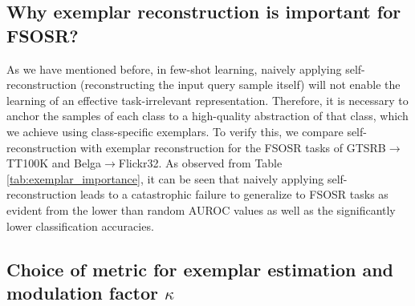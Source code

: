 \documentclass[10pt,journal,compsoc]{IEEEtran}
\begin{document}
\subsection{Why exemplar reconstruction is important for FSOSR?}
As we have mentioned before, in few-shot learning, naively applying self-reconstruction (reconstructing the input query sample itself) will not enable the learning of an effective task-irrelevant representation. Therefore, it is necessary to anchor the samples of each class to a high-quality abstraction of that class, which we achieve using class-specific exemplars. To verify this, we compare self-reconstruction with exemplar reconstruction for the FSOSR tasks of GTSRB$\rightarrow$TT100K and Belga$\rightarrow$Flickr32. As observed from Table \ref{tab:exemplar_importance}, it can be seen that naively applying self-reconstruction leads to a catastrophic failure to generalize to FSOSR tasks as evident from the lower than random AUROC values as well as the significantly lower classification accuracies.



\subsection{Choice of metric for exemplar estimation and modulation factor $\kappa$}
\end{document}
